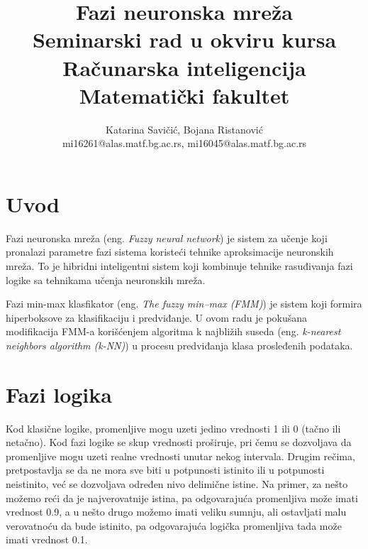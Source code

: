 \documentclass[a4paper]{article}
\begin{document}
\title{Fazi neuronska mreža\\ \small{Seminarski rad u okviru kursa\\Računarska inteligencija\\ Matematički fakultet}}

\author{Katarina Savičić, Bojana Ristanović\\ mi16261@alas.matf.bg.ac.rs, mi16045@alas.matf.bg.ac.rs}

\maketitle

\tableofcontents

\newpage

\section{Uvod}
\label{sec:uvod}

Fazi neuronska mreža (eng. \emph{Fuzzy neural network}) je sistem za učenje koji pronalazi parametre fazi sistema koristeći tehnike aproksimacije neuronskih mreža. To je hibridni inteligentni sistem koji kombinuje tehnike rasuđivanja fazi logike sa tehnikama učenja neuronskih mreža.\cite{fnn}

Fazi min-max klasfikator (eng. \emph{The fuzzy min–max (FMM)}) je sistem koji formira hiperboksove za klasifikaciju i predviđanje. U ovom radu je pokušana modifikacija FMM-a korišćenjem algoritma k najbližih suseda (eng. \emph{k-nearest neighbors algorithm (k-NN)}) u procesu predviđanja klasa prosleđenih podataka.

\section{Fazi logika}
\label{sec:fazilogika}

Kod klasične logike, promenljive mogu uzeti jedino vrednosti 1 ili 0 (tačno ili netačno). Kod fazi logike se skup vrednosti proširuje, pri čemu 
se dozvoljava da promenljive mogu uzeti realne vrednosti unutar nekog intervala. Drugim rečima, pretpostavlja se da ne mora sve biti u 
potpunosti istinito ili u potpunosti neistinito, već se dozvoljava određen nivo delimične istine. Na primer, za nešto možemo reći da je 
najverovatnije istina, pa odgovarajuća promenljiva može imati vrednost 0.9, a u nešto drugo možemo imati veliku sumnju, ali ostavljati 
malu verovatnoću da bude istinito, pa odgovarajuća logička promenljiva tada može imati vrednost 0.1. \cite{fl}
\end{document}
